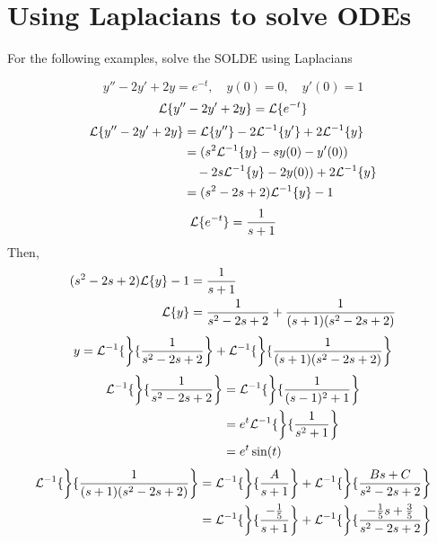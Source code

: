 \documentclass[diffeq.tex]{subfiles}
\begin{document}
    \section{Using Laplacians to solve ODEs}
    For the following examples, solve the SOLDE using Laplacians
    \begin{example}
        \begin{equation}
            y'' - 2y' + 2y = e^{-t},\quad y(0) = 0,\quad y'(0) = 1
        \end{equation}
        \begin{equation}
            \mathcal{L}\{y'' - 2y' + 2y\} = \mathcal{L}\{e^{-t}\}
        \end{equation}
        \begin{alignat}{1}
            \mathcal{L}\{y'' - 2y' + 2y\} &= \mathcal{L}\{y''\} - 2\mathcal{L}^{-1}\{y'\} + 2\mathcal{L}^{-1}\{y\}\\
            &= (s^{2}\mathcal{L}^{-1}\{y\} - sy(0) - y'(0))\\
            &\quad- 2s\mathcal{L}^{-1}\{y\} - 2y(0)) + 2\mathcal{L}^{-1}\{y\}\nonumber\\
            &= (s^{2} - 2s + 2)\mathcal{L}^{-1}\{y\} - 1
        \end{alignat}
        \begin{equation}
            \mathcal{L}\{e^{-t}\} = \frac{1}{s + 1}
        \end{equation}
        Then,
        \begin{alignat}{1}
            (s^{2} - 2s + 2)\mathcal{L}\{y\} - 1 &= \frac{1}{s + 1}\\
            \mathcal{L}\{y\} &= \frac{1}{s^{2} - 2s + 2} + \frac{1}{(s + 1)(s^{2}-2s + 2)}
        \end{alignat}
        \begin{equation}
            y = \mathcal{L}^{-1}\{\left\}\{\frac{1}{s^{2} - 2s + 2}\right\} + \mathcal{L}^{-1}\{\left\}\{\frac{1}{(s + 1)(s^{2}-2s + 2)}\right\}
        \end{equation}
        \begin{alignat}{1}
            \mathcal{L}^{-1}\{\left\}\{\frac{1}{s^{2} - 2s + 2}\right\} &= \mathcal{L}^{-1}\{\left\}\{\frac{1}{(s - 1)^{2} + 1}\right\}\\
            &= e^{t}\mathcal{L}^{-1}\{\left\}\{\frac{1}{s^{2} + 1}\right\}\\
            &= e^{t}\sin(t)
        \end{alignat}
        \begin{alignat}{1}
            \lpinv\left\{\frac{1}{(s + 1)(s^{2} - 2s + 2)}\right\} &= \lpinv\left\{\frac{A}{s + 1}\right\} + \lpinv\left\{\frac{Bs + C}{s^{2} - 2s + 2}\right\}\\
            &= \lpinv\left\{\frac{-\frac{1}{5}}{s + 1}\right\} + \lpinv\left\{\frac{-\frac{1}{5}s + \frac{3}{5}}{s^{2} - 2s + 2}\right\}\\

\end{alignat}
\end{example}
\end{document}
